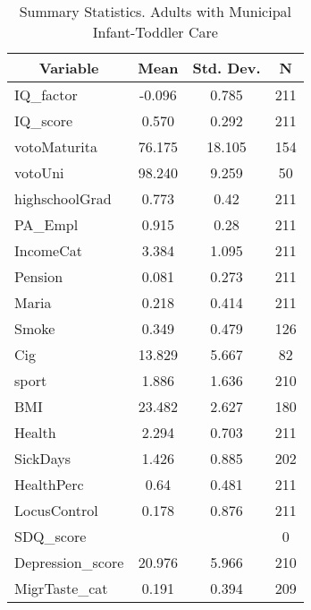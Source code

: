 
\begin{table}[htbp]\centering \caption{Summary Statistics. Adults with Municipal Infant-Toddler Care \label{schoolAdultasiloMuni}}
\begin{tabular}{l c c  c}\hline\hline
\multicolumn{1}{c}{\textbf{Variable}} & \textbf{Mean}
 & \textbf{Std. Dev.} & \textbf{N}\\ \hline
IQ\_factor & -0.096 & 0.785  & 211\\
IQ\_score & 0.570 & 0.292  & 211\\
votoMaturita & 76.175 & 18.105  & 154\\
votoUni & 98.240 & 9.259  & 50\\
highschoolGrad & 0.773 & 0.42  & 211\\
PA\_Empl & 0.915 & 0.28  & 211\\
IncomeCat & 3.384 & 1.095  & 211\\
Pension & 0.081 & 0.273  & 211\\
Maria & 0.218 & 0.414  & 211\\
Smoke & 0.349 & 0.479  & 126\\
Cig & 13.829 & 5.667  & 82\\
sport & 1.886 & 1.636  & 210\\
BMI & 23.482 & 2.627  & 180\\
Health & 2.294 & 0.703  & 211\\
SickDays & 1.426 & 0.885  & 202\\
HealthPerc & 0.64 & 0.481  & 211\\
LocusControl & 0.178 & 0.876  & 211\\
SDQ\_score &  &   & 0\\
Depression\_score & 20.976 & 5.966  & 210\\
MigrTaste\_cat & 0.191 & 0.394  & 209\\
\hline\end{tabular}
\end{table}
